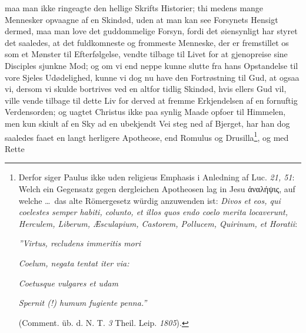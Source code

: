 \documentclass[12pt]{book}
\newcommand{\opage}[1]{\marginnote{\footnotesize\textit{[#1]}}}
\begin{document}
maa man ikke ringeagte den hellige Skrifts Historier; thi medens mange
Mennesker opvaagne af en Skindød, uden at man kan see Forsynets Hensigt
dermed, maa man love det guddommelige Forsyn, fordi det øiensynligt har styret
det saaledes, at det fuldkomneste og frommeste Menneske, der er fremstillet os
som et Mønster til Efterfølgelse, vendte tilbage til Livet for at gjenopreise
sine Disciples sjunkne Mod; og om vi end neppe kunne slutte fra hans
Opstandelse til vore Sjeles Udødelighed, kunne vi
%
%
\opage{96} %
\setcounter{footnote}{0}%
dog nu have den Fortrøstning til Gud, at ogsaa vi, dersom vi skulde bortrives
ved en altfor tidlig Skindød, hvis ellers Gud vil, ville vende tilbage til
dette Liv for derved at fremme Erkjendelsen af en fornuftig Verdensorden; og
uagtet Christus ikke paa synlig Maade opfoer til Himmelen, men kun skiult af en
Sky ad en ubekjendt Vei steg ned af Bjerget, har han dog saaledes faaet en
langt herligere Apotheose, end Romulus og Drusilla\footnote{Derfor siger Paulus
ikke uden religieus Emphasis i Anledning af Luc. \textit{21, 51}: Welch ein
Gegensatz gegen dergleichen Apotheosen lag in Jesu ἀναλήψις, auf welche \ldots\
das alte Römergesetz würdig anzuwenden ist: \textit{Divos et eos, qui coelestes
semper habiti, \emph{colunto, et illos quos endo coelo merita locaverunt},
Herculem, Liberum, Æsculapium, Castorem, Pollucem, Quirinum, et Horatii}:\par
\hspace*{2em}\textit{”Virtus, recludens immeritis mori}\par
\hspace*{2em}\textit{Coelum, negata tentat iter via:}\par
\hspace*{2em}\textit{Coetusque vulgares et udam}\par
\hspace*{2em}\textit{\emph{Spernit} (!) humum fugiente penna.”}\par
(Comment. üb. d. N. T. \textit{3} Theil. Leip. \textit{1805}).}, og med Rette
\end{document}
